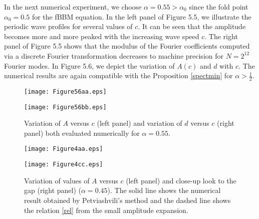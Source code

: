 \documentclass[12pt,reqno]{amsart}
\newcommand{\2}{L^2_{per}(0, T)}
\numberwithin{equation}{section}
\numberwithin{figure}{section}
\begin{document}
\indent
In the next numerical experiment, we  choose $\alpha=0.55> \alpha_0$   since the fold point $\alpha_0=0.5$ for the fBBM equation.
In the left panel of  Figure 5.5, we illustrate the periodic wave profiles for several  values  of $c$. It can be seen that the amplitude becomes more and more peaked  with the increasing wave speed $c$.  The right panel of Figure 5.5 shows that the modulus of the Fourier coefficients computed via a discrete Fourier transformation  decreases to machine precision for
 $N = 2^{12}$ Fourier modes. {In  Figure 5.6, we depict the
variation of $A(c)$  and $d$  with $c$. The numerical results are again compatible with the Proposition  \ref{spectmin}  for $\alpha > \frac{1}{2}$.
}
\begin{figure}[!htbp]
\begin{minipage}[t]{0.49\linewidth}
   \texttt{[image: Figure56aa.eps]}
 \end{minipage}
  \begin{minipage}[t]{0.49\linewidth}
   \texttt{[image: Figure56bb.eps]}
 \end{minipage}
  \caption{Variation of  $A$ versus $c$ (left panel) and variation of  $d$ versus $c$ (right panel) both evaluated  numerically for  $\alpha=0.55$.}
\end{figure}


\begin{figure}[!htbp]
\begin{minipage}[t]{0.49\linewidth}
   \texttt{[image: Figure4aa.eps]}
 \end{minipage}
  \begin{minipage}[t]{0.49\linewidth}
   \texttt{[image: Figure4cc.eps]}
 \end{minipage}
 \caption{Variation of  values of  $A$ versus $c$ (left panel) and  close-up look to the gap   (right panel)  ($\alpha=0.45$). The solid line shows the numerical result obtained by Petviashvili's method and the dashed line shows the relation \eqref{rel}  from the small amplitude expansion. }
\end{figure}
\end{document}
